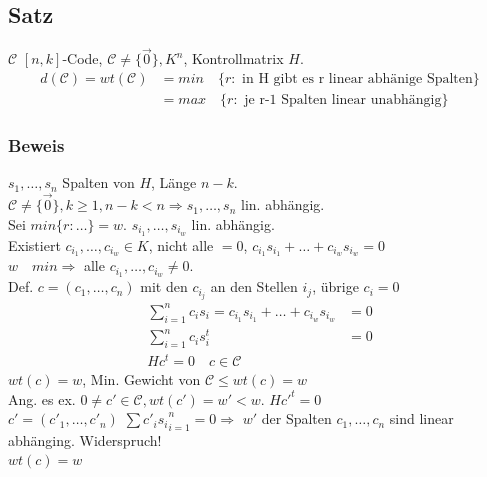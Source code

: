%
%
\subsection{Satz}
$\mathcal{C}$ $[n,k]$-Code, $\mathcal{C} \neq \lbrace \vec{0} \rbrace, K^n$, Kontrollmatrix $H$.\\
\begin{align*}
d(\mathcal{C})=wt(\mathcal{C}) &= min \quad 	\lbrace r : \text{ in H gibt es r linear abh\"anige Spalten}  \rbrace \\
&= max  \quad \lbrace r : \text{ je r-1 Spalten linear unabh\"angig} \rbrace
\end{align*}

\subsubsection{Beweis}
$s_1,\ldots,s_n$ Spalten von $H$, L\"ange $n-k$. \\
$\mathcal{C} \neq \lbrace \vec{0} \rbrace, k \geq	 1, n-k<n \Rightarrow s_1,\ldots,s_n$ lin. abh\"angig.\\
Sei $min \lbrace r: \ldots \rbrace = w$. $s_{i_1},\ldots, s_{i_w}$ lin. abh\"angig. \\
Existiert $c_{i_1},\ldots,c_{i_w} \in K$, nicht alle $=0$, $c_{i_1} s_{i_1}+\ldots+ c_{i_w} s_{i_w}=0$ \\
$w \quad min \Rightarrow$ alle $c_{i_1},\ldots, c_{i_w} \neq 0$. \\
Def. $c=(c_1, \ldots,  c_n)$ mit den $c_{i_j}$ an den Stellen $i_j$, \"ubrige $c_i=0$
\begin{align*}
	\sum^n_{i=1}{c_i s_i} = c_{i_1} s_{i_1} + \ldots + c_{i_w} s_{i_w} &=0\\
	\sum^n_{i=1}{c_i s_i^t}&=0 \\
	Hc^t=0 \quad c \in \mathcal{C}
\end{align*}
$wt(c)=w$, Min. Gewicht von $\mathcal{C} \leq wt(c)=w$ \\
Ang. es ex. $0 \neq c' \in \mathcal{C}, wt(c')=w' < w$. $Hc'^t=0$\\
$c'=(c'_1, \ldots,  c'_n)$ \quad $\sum{c'_i s_i}^n_{i=1}=0 \Rightarrow$ $w'$ der Spalten $c_1,\ldots,c_n$ sind linear abh\"anging. Widerspruch! \\
$wt(c)=w$

%
%

